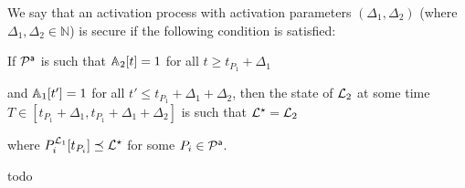 \begin{definition}
 We say that an activation process with activation parameters $(\Delta_1,\Delta_2)$ (where $\Delta_1,\Delta_2\in\mathbb{N}$) is secure if the following condition is satisfied:

If $\mathcal{P}^\mathsf{a}$ is such that $\mathbb{A}_2[t]=1$ for all $t\geq t_{P_1}+\Delta_1$ %


	and $\mathbb{A}_1[t']=1$ for all $t' \leq t_{P_1}+\Delta_1+\Delta_2$, then the state of $\mathcal{L}_2$ at some time $T\in [t_{P_1}+\Delta_1, t_{P_1}+\Delta_1+\Delta_2]$ is such that $\mathcal{L}^\star=\mathcal{L}_2$
	
	
	where $  P_i^{\mathcal{L}_1}[t_{P_i}] \preceq \mathcal{L}^\star$ for some $P_i\in\mathcal{P}^\mathsf{a}$.  

 
\end{definition}

\begin{definition}\label{def:genesis}
todo
\end{definition}


